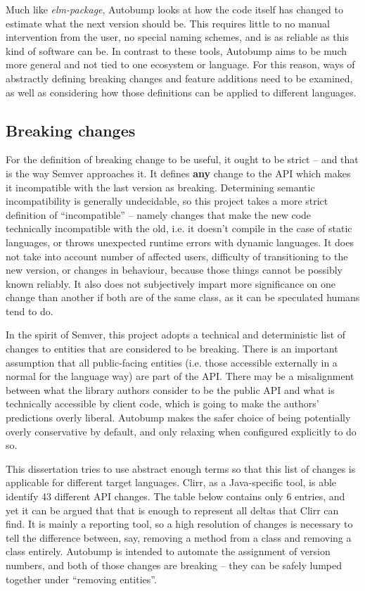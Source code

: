 \documentclass{l4proj}
\begin{document}
Much like \textit{elm-package}, Autobump looks at how the code itself
has changed to estimate what the next version should be. This requires
little to no manual intervention from the user, no special naming
schemes, and is as reliable as this kind of software can be. In
contrast to these tools, Autobump aims to be much more general and
not tied to one ecosystem or language. For this reason,
ways of abstractly defining breaking changes and feature additions
need to be examined, as well as considering how those definitions can
be applied to different languages.

\subsection{Breaking changes}
\label{BreakingChanges}

For the definition of breaking change to be useful, it ought to be
strict -- and that is the way Semver approaches it. It defines
\textbf{any} change to the API which makes it incompatible with the
last version as breaking. Determining semantic incompatibility is
generally undecidable, so this project takes a more strict definition of
``incompatible'' -- namely changes that make the new code technically
incompatible with the old, i.e. it doesn't compile in the case of
static languages, or throws unexpected runtime errors with dynamic
languages. It does not take into account number of affected users,
difficulty of transitioning to the new version, or changes in
behaviour, because those things cannot be possibly known reliably. It
also does not subjectively impart more significance on one change than
another if both are of the same class, as it can be speculated humans
tend to do.

In the spirit of Semver, this project adopts a technical and
deterministic list of changes to entities that are considered
to be breaking. There is an important assumption that all
public-facing entities (i.e. those accessible externally in a normal
for the language way) are part of the API. There may be a misalignment
between what the library authors consider to be the public API and
what is technically accessible by client code, which is going to make
the authors' predictions overly liberal. Autobump makes the safer
choice of being potentially overly conservative by default, and only
relaxing when configured explicitly to do so.

This dissertation tries to use abstract enough terms so that this list
of changes is applicable for different target languages. Clirr, as a
Java-specific tool, is able identify 43 different API changes. The
table below contains only 6 entries, and yet it can be argued that
that is enough to represent all deltas that Clirr can find. It is
mainly a reporting tool, so a high resolution of changes is necessary
to tell the difference between, say, removing a method from a class
and removing a class entirely. Autobump is intended to automate the
assignment of version numbers, and both of those changes are breaking
-- they can be safely lumped together under ``removing entities''.
\end{document}
